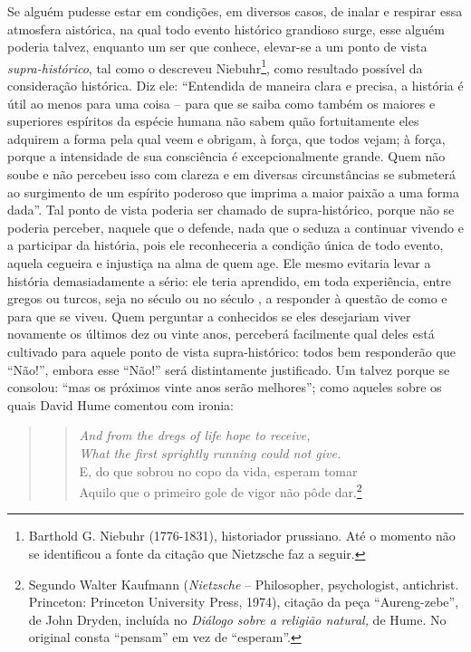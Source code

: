 Se alguém pudesse estar em condições, em diversos casos, de inalar e
respirar essa atmosfera aistórica, na qual todo evento histórico
grandioso surge, esse alguém poderia talvez, enquanto um ser que
conhece, elevar-se a um ponto de vista \emph{supra-histórico}, tal como
o descreveu Niebuhr\footnote{Barthold G. Niebuhr (1776-1831),
  historiador prussiano. Até o momento não se identificou a fonte da
  citação que Nietz\-sche faz a seguir.}, como resultado possível da
consideração histórica. Diz ele: ``Entendida de maneira clara e precisa,
a história é útil ao menos para uma coisa -- para que se saiba como também
os maiores e superiores espíritos da espécie humana não sabem quão
fortuitamente eles adquirem a forma pela qual veem e obrigam, à força,
que todos vejam; à força, porque a intensidade de sua consciência é
excepcionalmente grande. Quem não soube e não percebeu isso com clareza e em diversas
circunstâncias se submeterá ao surgimento de um espírito poderoso que
imprima a maior paixão a uma forma dada''. Tal ponto de vista poderia
ser chamado de supra-histórico, porque não se poderia perceber, naquele
que o defende, nada que o seduza a continuar vivendo e a participar da
história, pois ele reconheceria a condição única de todo evento, aquela
cegueira e injustiça na alma de quem age. Ele mesmo evitaria levar a
história demasiadamente a sério: ele teria aprendido, em toda
experiência, entre gregos ou turcos, seja no século  ou no século ,
a responder à questão de como e para que se viveu. Quem perguntar a
conhecidos se eles desejariam viver novamente os últimos dez ou vinte
anos, perceberá facilmente qual deles está cultivado para aquele ponto
de vista supra-histórico: todos bem responderão que ``Não!'', embora
esse ``Não!'' será distintamente justificado. Um talvez porque se
consolou: ``mas os próximos vinte anos serão melhores''; como aqueles
sobre os quais David Hume comentou com ironia:

\begin{quote}
\begin{verse}
\emph{And from the dregs of life hope to receive,}\\
\emph{What the first sprightly running could not give.}\\
E, do que sobrou no copo da vida,\qb{} esperam tomar\\
Aquilo que o primeiro gole de vigor\qb{} não pôde dar.\footnote{Segundo
  Walter Kaufmann (\emph{Nietz\-sche} -- Philosopher, psychologist,
  antichrist. Princeton: Princeton University Press, 1974),
  citação da peça ``Aureng-zebe'', de John Dryden, incluída no
  \emph{Diálogo sobre a religião natural,} de Hume. No original consta
  ``pensam'' em vez de ``esperam''.}
\end{verse}
\end{quote}

